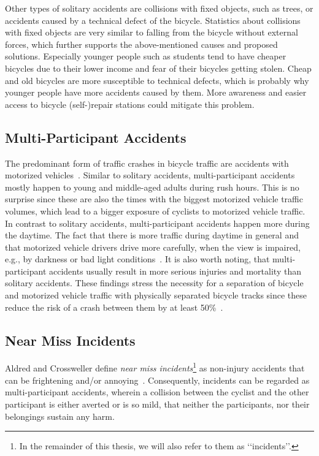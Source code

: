 Other types of solitary accidents are collisions with fixed objects, such as trees, or accidents caused by a technical defect of the bicycle.
Statistics about collisions with fixed objects are very similar to falling from the bicycle without external forces, which further supports the above-mentioned causes and proposed solutions.
Especially younger people such as students tend to have cheaper bicycles due to their lower income and fear of their bicycles getting stolen.
Cheap and old bicycles are more susceptible to technical defects, which is probably why younger people have more accidents caused by them.
More awareness and easier access to bicycle (self-)repair stations could mitigate this problem.

\subsection*{Multi-Participant Accidents}
The predominant form of traffic crashes in bicycle traffic are accidents with motorized vehicles~\cite{juhra2012bicycle,naess2020number}.
Similar to solitary accidents, multi-participant accidents mostly happen to young and middle-aged adults during rush hours.
This is no surprise since these are also the times with the biggest motorized vehicle traffic volumes, which lead to a bigger exposure of cyclists to motorized vehicle traffic.
In contrast to solitary accidents, multi-participant accidents happen more during the daytime.
The fact that there is more traffic during daytime in general and that motorized vehicle drivers drive more carefully, when the view is impaired, e.g., by darkness or bad light conditions~\cite{schepers2011road}.
It is also worth noting, that multi-participant accidents usually result in more serious injuries and mortality than solitary accidents. 
These findings stress the necessity for a separation of bicycle and motorized vehicle traffic with physically separated bicycle tracks since these reduce the risk of a crash between them by at least 50\%~\cite{van2021safety}.

\subsection*{Near Miss Incidents}
Aldred and Crossweller define \textit{near miss incidents}\footnote{In the remainder of this thesis, we will also refer to them as ‘‘incidents’’.} as non-injury accidents that can be frightening and/or annoying~\cite{aldred2015investigating}.
Consequently, incidents can be regarded as multi-participant accidents, wherein a collision between the cyclist and the other participant is either averted or is so mild, that neither the participants, nor their belongings sustain any harm.

